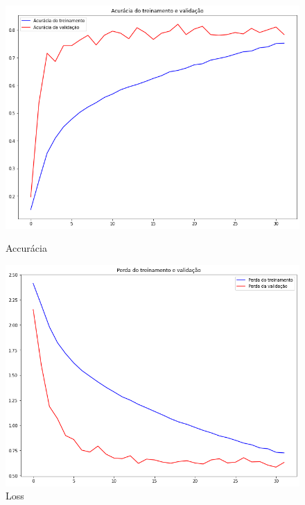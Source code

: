 \documentclass[12pt]{article}
\begin{document}
\begin{figure}[!htb]
  \begin{minipage}{.47\textwidth}
    \centering
    \includegraphics[width=1.1\linewidth]{experiments/default_aug_32/accuracy.png}
    \caption{Accurácia}\label{fig:experiment_default_aug_32_accuracy}
  \end{minipage}\hfill
  \begin{minipage}{.47\textwidth}
    \centering
    \includegraphics[width=1.1\linewidth]{experiments/default_aug_32/loss.png}
    \caption{Loss}\label{fig:experiment_default_aug_32_loss}
  \end{minipage}
\end{figure}
\end{document}
